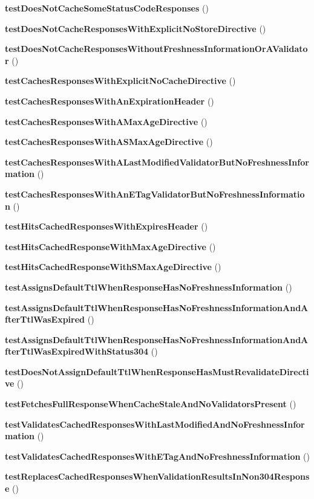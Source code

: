 \begin{DoxyCompactItemize}
{\bf test\+Does\+Not\+Cache\+Some\+Status\+Code\+Responses} ()
\item 
{\bf test\+Does\+Not\+Cache\+Responses\+With\+Explicit\+No\+Store\+Directive} ()
\item 
{\bf test\+Does\+Not\+Cache\+Responses\+Without\+Freshness\+Information\+Or\+A\+Validator} ()
\item 
{\bf test\+Caches\+Responses\+With\+Explicit\+No\+Cache\+Directive} ()
\item 
{\bf test\+Caches\+Responses\+With\+An\+Expiration\+Header} ()
\item 
{\bf test\+Caches\+Responses\+With\+A\+Max\+Age\+Directive} ()
\item 
{\bf test\+Caches\+Responses\+With\+A\+S\+Max\+Age\+Directive} ()
\item 
{\bf test\+Caches\+Responses\+With\+A\+Last\+Modified\+Validator\+But\+No\+Freshness\+Information} ()
\item 
{\bf test\+Caches\+Responses\+With\+An\+E\+Tag\+Validator\+But\+No\+Freshness\+Information} ()
\item 
{\bf test\+Hits\+Cached\+Responses\+With\+Expires\+Header} ()
\item 
{\bf test\+Hits\+Cached\+Response\+With\+Max\+Age\+Directive} ()
\item 
{\bf test\+Hits\+Cached\+Response\+With\+S\+Max\+Age\+Directive} ()
\item 
{\bf test\+Assigns\+Default\+Ttl\+When\+Response\+Has\+No\+Freshness\+Information} ()
\item 
{\bf test\+Assigns\+Default\+Ttl\+When\+Response\+Has\+No\+Freshness\+Information\+And\+After\+Ttl\+Was\+Expired} ()
\item 
{\bf test\+Assigns\+Default\+Ttl\+When\+Response\+Has\+No\+Freshness\+Information\+And\+After\+Ttl\+Was\+Expired\+With\+Status304} ()
\item 
{\bf test\+Does\+Not\+Assign\+Default\+Ttl\+When\+Response\+Has\+Must\+Revalidate\+Directive} ()
\item 
{\bf test\+Fetches\+Full\+Response\+When\+Cache\+Stale\+And\+No\+Validators\+Present} ()
\item 
{\bf test\+Validates\+Cached\+Responses\+With\+Last\+Modified\+And\+No\+Freshness\+Information} ()
\item 
{\bf test\+Validates\+Cached\+Responses\+With\+E\+Tag\+And\+No\+Freshness\+Information} ()
\item 
{\bf test\+Replaces\+Cached\+Responses\+When\+Validation\+Results\+In\+Non304\+Response} ()
\item 

\end{DoxyCompactItemize}
